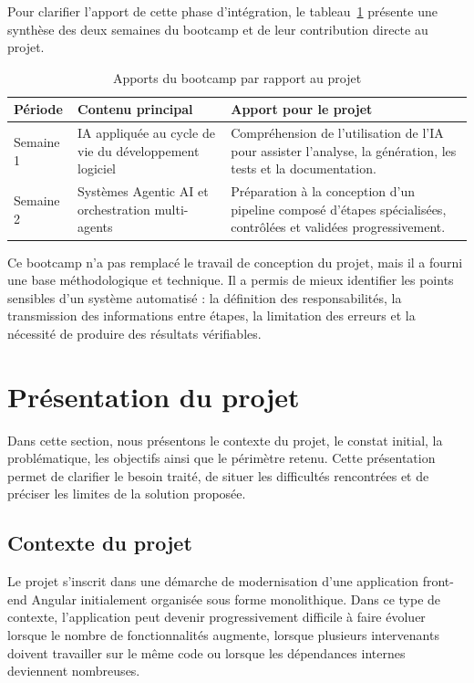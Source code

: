 Pour clarifier l'apport de cette phase d'intégration, le tableau~\ref{tab:bootcamp-apports} présente une synthèse des deux semaines du bootcamp et de leur contribution directe au projet.

\begingroup
\renewcommand{\arraystretch}{1.25}
\begin{longtable}{|p{3.2cm}|p{5.5cm}|p{5.5cm}|}
\caption{Apports du bootcamp par rapport au projet}\label{tab:bootcamp-apports}\\
\hline
\textbf{Période} & \textbf{Contenu principal} & \textbf{Apport pour le projet} \\
\hline
Semaine 1 & IA appliquée au cycle de vie du développement logiciel & Compréhension de l'utilisation de l'IA pour assister l'analyse, la génération, les tests et la documentation. \\
\hline
Semaine 2 & Systèmes Agentic AI et orchestration multi-agents & Préparation à la conception d'un pipeline composé d'étapes spécialisées, contrôlées et validées progressivement. \\
\hline
\end{longtable}
\endgroup

Ce bootcamp n'a pas remplacé le travail de conception du projet, mais il a fourni une base méthodologique et technique. Il a permis de mieux identifier les points sensibles d'un système automatisé : la définition des responsabilités, la transmission des informations entre étapes, la limitation des erreurs et la nécessité de produire des résultats vérifiables.

\section{Présentation du projet}

Dans cette section, nous présentons le contexte du projet, le constat initial, la problématique, les objectifs ainsi que le périmètre retenu. Cette présentation permet de clarifier le besoin traité, de situer les difficultés rencontrées et de préciser les limites de la solution proposée.

\subsection{Contexte du projet}

Le projet s'inscrit dans une démarche de modernisation d'une application front-end Angular initialement organisée sous forme monolithique. Dans ce type de contexte, l'application peut devenir progressivement difficile à faire évoluer lorsque le nombre de fonctionnalités augmente, lorsque plusieurs intervenants doivent travailler sur le même code ou lorsque les dépendances internes deviennent nombreuses.

